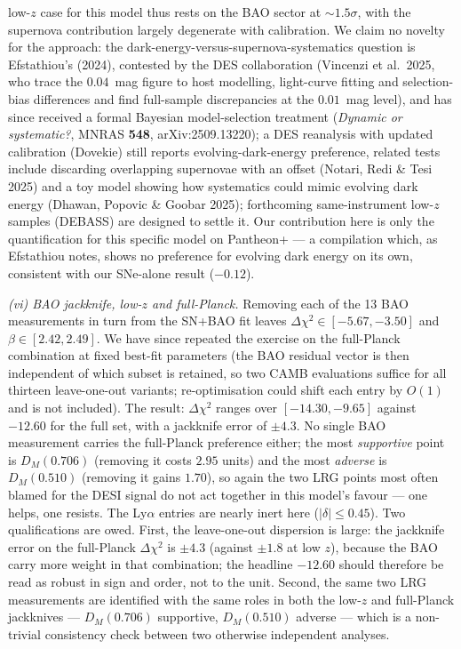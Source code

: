 \documentclass[11pt]{article}
\begin{document}
low-$z$ case for this model thus rests on the BAO sector at $\sim 1.5\sigma$, with the supernova
contribution largely degenerate with calibration. We claim no novelty for the approach: the
dark-energy-versus-supernova-systematics question is Efstathiou's (2024), contested by the DES
collaboration (Vincenzi et al.\ 2025, who trace the $0.04$~mag figure to host modelling, light-curve
fitting and selection-bias differences and find full-sample discrepancies at the $0.01$~mag level),
and has since received a formal Bayesian model-selection treatment (\emph{Dynamic or systematic?}, MNRAS \textbf{548}, arXiv:2509.13220);
a DES reanalysis with updated calibration (Dovekie) still reports evolving-dark-energy preference,
related tests include discarding overlapping supernovae with an offset (Notari, Redi \& Tesi 2025) and a toy model showing how systematics could mimic evolving dark energy (Dhawan, Popovic \& Goobar 2025); forthcoming same-instrument low-$z$ samples (DEBASS) are designed to settle it. Our contribution
here is only the quantification for this specific model on Pantheon+ --- a compilation which, as
Efstathiou notes, shows no preference for evolving dark energy on its own, consistent with our
SNe-alone result ($-0.12$).

\emph{(vi) BAO jackknife, low-$z$ and full-Planck.} Removing each of the 13 BAO measurements in
turn from the SN+BAO fit leaves $\Delta\chi^2 \in [-5.67, -3.50]$ and $\beta \in [2.42, 2.49]$. We
have since repeated the exercise on the full-Planck combination at fixed best-fit parameters (the
BAO residual vector is then independent of which subset is retained, so two CAMB evaluations
suffice for all thirteen leave-one-out variants; re-optimisation could shift each entry by
$O(1)$ and is not included). The result: $\Delta\chi^2$ ranges over $[-14.30, -9.65]$ against
$-12.60$ for the full set, with a jackknife error of $\pm 4.3$. No single BAO measurement carries
the full-Planck preference either; the most \emph{supportive} point is $D_M(0.706)$ (removing it
costs $2.95$ units) and the most \emph{adverse} is $D_M(0.510)$ (removing it gains $1.70$), so
again the two LRG points most often blamed for the DESI signal do not act together in this
model's favour --- one helps, one resists. The Ly$\alpha$ entries are nearly inert here ($|\delta| \le 0.45$). Two qualifications are owed.
First, the leave-one-out dispersion is large: the jackknife error on the full-Planck
$\Delta\chi^2$ is $\pm 4.3$ (against $\pm 1.8$ at low $z$), because the BAO carry more weight in
that combination; the headline $-12.60$ should therefore be read as robust in sign and order, not
to the unit. Second, the same two LRG measurements are identified with the same roles in both the
low-$z$ and full-Planck jackknives --- $D_M(0.706)$ supportive, $D_M(0.510)$ adverse --- which is a
non-trivial consistency check between two otherwise independent analyses.
\end{document}
